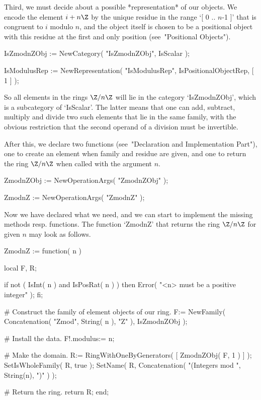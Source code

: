 Third, we must decide about a possible *representation* of our objects.
We encode the element $i + n\Z$ by the unique residue in the range
`[ 0 .. $n$-1 ]' that is congruent to $i$ modulo $n$,
and the object itself is chosen to be a positional object with this
residue at the first and only position (see~"Positional Objects").

\begintt
    IsZmodnZObj := NewCategory( "IsZmodnZObj", IsScalar );

    IsModulusRep := NewRepresentation( "IsModulusRep",
        IsPositionalObjectRep,
        [ 1 ] );
\endtt

So all elements in the rings $\Z/n\Z$ will lie in the category
`IsZmodnZObj',
which is a subcategory of `IsScalar'.
The latter means that one can add, subtract, multiply and divide
two such elements that lie in the same family,
with the obvious restriction that the second operand of a division
must be invertible.

After this, we declare two functions
(see~"Declaration and Implementation Part"),
one to create an element when family and residue are given,
and one to return the ring $\Z/n\Z$ when called with the argument $n$.

\begintt
    ZmodnZObj := NewOperationArgs( "ZmodnZObj" );

    ZmodnZ := NewOperationArgs( "ZmodnZ" );
\endtt

Now we have declared what we need,
and we can start to implement the missing methods resp. functions.
The function `ZmodnZ' that returns the ring $\Z/n\Z$ for given $n$
may look as follows.

\begintt
    ZmodnZ := function( n )

        local F, R;

        if not ( IsInt( n ) and IsPosRat( n ) ) then
          Error( "<n> must be a positive integer" );
        fi;

        # Construct the family of element objects of our ring.
        F:= NewFamily( Concatenation( "Zmod", String( n ), "Z" ),
                       IsZmodnZObj );

        # Install the data.
        F!.modulus:= n;

        # Make the domain.
        R:= RingWithOneByGenerators( [ ZmodnZObj( F, 1 ) ] );
        SetIsWholeFamily( R, true );
        SetName( R, Concatenation( "(Integers mod ", String(n), ")" ) );

        # Return the ring.
        return R;
    end;
\endtt

